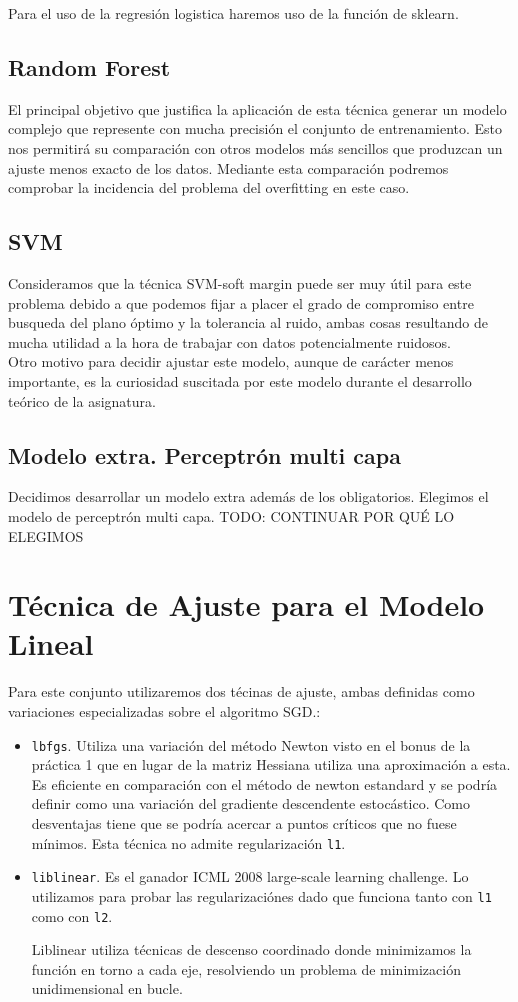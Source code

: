 \documentclass[11pt,a4paper]{article}
\begin{document}
Para el uso de la regresión logistica haremos uso de la función de sklearn. 

\subsection{Random Forest}

El principal objetivo que justifica la aplicación de esta técnica generar un modelo complejo que represente con mucha precisión el conjunto de entrenamiento. Esto nos permitirá su comparación con otros modelos más sencillos que produzcan un ajuste menos exacto de los datos. Mediante esta comparación podremos comprobar la incidencia del problema del overfitting en este caso. 

\subsection{SVM}

Consideramos que la técnica SVM-soft margin puede ser muy útil para este problema debido a que podemos fijar a placer el grado de compromiso entre busqueda del plano óptimo y la tolerancia al ruido, ambas cosas resultando de mucha utilidad a la hora de trabajar con datos potencialmente ruidosos.\\

Otro motivo para decidir ajustar este modelo, aunque de carácter menos importante, es la curiosidad suscitada por este modelo durante el desarrollo teórico de la asignatura. 

\subsection{Modelo extra. Perceptrón multi capa}
Decidimos desarrollar un modelo extra además de los obligatorios. Elegimos el modelo de perceptrón multi capa. TODO: CONTINUAR POR QUÉ LO ELEGIMOS

\section{ Técnica de Ajuste para el Modelo Lineal}
Para este conjunto utilizaremos dos técinas de ajuste, ambas definidas como variaciones especializadas sobre el algoritmo SGD.:
\begin{itemize}
	\item \texttt{lbfgs}. Utiliza una variación del método Newton visto en el bonus de la práctica 1 que en lugar de la matriz Hessiana utiliza una aproximación a esta. Es eficiente en comparación con el método de newton estandard y se podría definir como una variación del gradiente descendente estocástico. Como desventajas tiene que se podría acercar a puntos críticos que no fuese mínimos. Esta técnica no admite regularización \texttt{l1}.
	\item \texttt{liblinear}. Es el ganador ICML 2008 large-scale learning challenge. Lo utilizamos para probar las regularizaciónes dado que funciona tanto con \texttt{l1} como con \texttt{l2}.
	
	Liblinear utiliza técnicas de descenso coordinado\cite{CD} donde minimizamos la función en torno a cada eje, resolviendo un problema de minimización unidimensional en bucle. 
\end{itemize}
\end{document}
